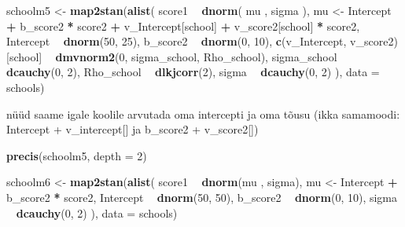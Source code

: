 \documentclass[]{book}
\newenvironment{Shaded}{\begin{snugshade}}{\end{snugshade}}
\newcommand{\DataTypeTok}[1]{\textcolor[rgb]{0.13,0.29,0.53}{#1}}
\newcommand{\DecValTok}[1]{\textcolor[rgb]{0.00,0.00,0.81}{#1}}
\newcommand{\KeywordTok}[1]{\textcolor[rgb]{0.13,0.29,0.53}{\textbf{#1}}}
\newcommand{\NormalTok}[1]{#1}
\newcommand{\OperatorTok}[1]{\textcolor[rgb]{0.81,0.36,0.00}{\textbf{#1}}}
\newcommand{\StringTok}[1]{\textcolor[rgb]{0.31,0.60,0.02}{#1}}
\begin{document}
\begin{Shaded}
\begin{Highlighting}[]
\NormalTok{schoolm5 <-}\StringTok{ }\KeywordTok{map2stan}\NormalTok{(}\KeywordTok{alist}\NormalTok{(}
\NormalTok{    score1 }\OperatorTok{~}\StringTok{ }\KeywordTok{dnorm}\NormalTok{( mu , sigma ),}
\NormalTok{    mu <-}\StringTok{ }\NormalTok{Intercept }\OperatorTok{+}\StringTok{ }\NormalTok{b_score2 }\OperatorTok{*}\StringTok{ }\NormalTok{score2 }\OperatorTok{+}\StringTok{ }
\StringTok{      }\NormalTok{v_Intercept[school] }\OperatorTok{+}\StringTok{ }
\StringTok{      }\NormalTok{v_score2[school] }\OperatorTok{*}\StringTok{ }\NormalTok{score2,}
\NormalTok{    Intercept }\OperatorTok{~}\StringTok{ }\KeywordTok{dnorm}\NormalTok{(}\DecValTok{50}\NormalTok{, }\DecValTok{25}\NormalTok{),}
\NormalTok{    b_score2 }\OperatorTok{~}\StringTok{ }\KeywordTok{dnorm}\NormalTok{(}\DecValTok{0}\NormalTok{, }\DecValTok{10}\NormalTok{),}
    \KeywordTok{c}\NormalTok{(v_Intercept, v_score2)[school] }\OperatorTok{~}\StringTok{ }\KeywordTok{dmvnorm2}\NormalTok{(}\DecValTok{0}\NormalTok{, sigma_school, Rho_school),}
\NormalTok{    sigma_school }\OperatorTok{~}\StringTok{ }\KeywordTok{dcauchy}\NormalTok{(}\DecValTok{0}\NormalTok{, }\DecValTok{2}\NormalTok{),}
\NormalTok{    Rho_school }\OperatorTok{~}\StringTok{ }\KeywordTok{dlkjcorr}\NormalTok{(}\DecValTok{2}\NormalTok{),}
\NormalTok{    sigma }\OperatorTok{~}\StringTok{ }\KeywordTok{dcauchy}\NormalTok{(}\DecValTok{0}\NormalTok{, }\DecValTok{2}\NormalTok{)}
\NormalTok{), }\DataTypeTok{data =}\NormalTok{ schools)}
\end{Highlighting}
\end{Shaded}

nüüd saame igale koolile arvutada oma intercepti ja oma tõusu (ikka samamoodi: Intercept + v\_intercept{[}{]} ja b\_score2 + v\_score2{[}{]})

\begin{Shaded}
\begin{Highlighting}[]
\KeywordTok{precis}\NormalTok{(schoolm5, }\DataTypeTok{depth =} \DecValTok{2}\NormalTok{)}
\end{Highlighting}
\end{Shaded}

\begin{Shaded}
\begin{Highlighting}[]
\NormalTok{schoolm6 <-}\StringTok{ }\KeywordTok{map2stan}\NormalTok{(}\KeywordTok{alist}\NormalTok{(}
\NormalTok{  score1 }\OperatorTok{~}\StringTok{ }\KeywordTok{dnorm}\NormalTok{(mu , sigma),}
\NormalTok{  mu <-}\StringTok{ }\NormalTok{Intercept }\OperatorTok{+}\StringTok{ }\NormalTok{b_score2 }\OperatorTok{*}\StringTok{ }\NormalTok{score2,}
\NormalTok{  Intercept }\OperatorTok{~}\StringTok{ }\KeywordTok{dnorm}\NormalTok{(}\DecValTok{50}\NormalTok{, }\DecValTok{50}\NormalTok{),}
\NormalTok{  b_score2 }\OperatorTok{~}\StringTok{ }\KeywordTok{dnorm}\NormalTok{(}\DecValTok{0}\NormalTok{, }\DecValTok{10}\NormalTok{),}
\NormalTok{  sigma }\OperatorTok{~}\StringTok{ }\KeywordTok{dcauchy}\NormalTok{(}\DecValTok{0}\NormalTok{, }\DecValTok{2}\NormalTok{)}
\NormalTok{), }\DataTypeTok{data =}\NormalTok{ schools)}
\end{Highlighting}
\end{Shaded}
\end{document}
